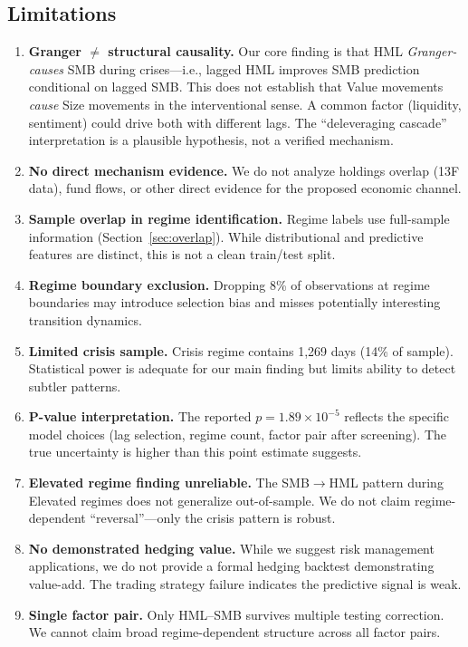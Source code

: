 \documentclass[sigconf]{acmart}
\begin{document}
\subsection{Limitations}
\label{sec:limitations}

\begin{enumerate}
    \item \textbf{Granger $\neq$ structural causality.} Our core finding is that
    HML \emph{Granger-causes} SMB during crises---i.e., lagged HML improves SMB
    prediction conditional on lagged SMB. This does not establish that Value
    movements \emph{cause} Size movements in the interventional sense. A common
    factor (liquidity, sentiment) could drive both with different lags. The
    ``deleveraging cascade'' interpretation is a plausible hypothesis, not a verified
    mechanism.

    \item \textbf{No direct mechanism evidence.} We do not analyze holdings overlap
    (13F data), fund flows, or other direct evidence for the proposed economic channel.

    \item \textbf{Sample overlap in regime identification.} Regime labels use full-sample
    information (Section~\ref{sec:overlap}). While distributional and predictive features
    are distinct, this is not a clean train/test split.

    \item \textbf{Regime boundary exclusion.} Dropping 8\% of observations at regime
    boundaries may introduce selection bias and misses potentially interesting
    transition dynamics.

    \item \textbf{Limited crisis sample.} Crisis regime contains 1,269 days (14\% of sample).
    Statistical power is adequate for our main finding but limits ability to detect
    subtler patterns.

    \item \textbf{P-value interpretation.} The reported $p = 1.89 \times 10^{-5}$
    reflects the specific model choices (lag selection, regime count, factor pair
    after screening). The true uncertainty is higher than this point estimate suggests.

    \item \textbf{Elevated regime finding unreliable.} The SMB$\to$HML pattern during
    Elevated regimes does not generalize out-of-sample. We do not claim regime-dependent
    ``reversal''---only the crisis pattern is robust.

    \item \textbf{No demonstrated hedging value.} While we suggest risk management
    applications, we do not provide a formal hedging backtest demonstrating value-add.
    The trading strategy failure indicates the predictive signal is weak.

    \item \textbf{Single factor pair.} Only HML--SMB survives multiple testing correction.
    We cannot claim broad regime-dependent structure across all factor pairs.
\end{enumerate}
\end{document}
